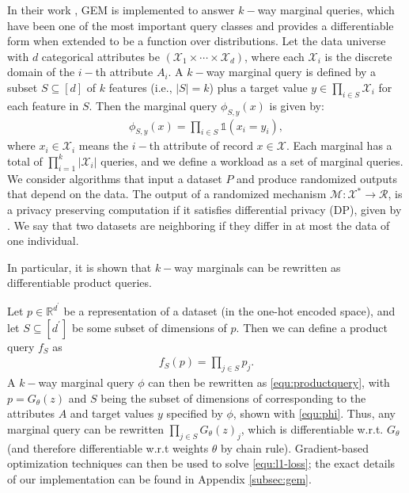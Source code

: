 In their work \citep{liu2021iterative}, GEM is implemented to answer $k-$way marginal queries, which have been one of the most important query classes and provides a differentiable form when extended to be a function over distributions. Let the data universe with $d$ categorical attributes be $(\mathcal{X}_1 \times \cdots \times \mathcal{X}_d)$, where each $\mathcal{X}_i$ is the discrete domain of the $i-$th attribute $A_i$. A $k-$way marginal query is defined by a subset $S\subseteq [d]$ of $k$ features (i.e., $|S| = k$) plus a target value $y\in\prod_{i\in S}\mathcal{X}_i$ for
each feature in $S$. Then the marginal query $\phi_{S,y}(x)$ is given by:
\begin{align}
    \label{equ:phi}
    \phi_{S,y}(x)=\prod _{i\in S}\mathbb{1}(x_i=y_i),
\end{align}
where $x_i\in\mathcal{X}_i$ means the $i-$th attribute of record $x\in \mathcal{X}$. Each marginal has a total of $\prod_{i=1}^{k}|\mathcal{X}_i|$ queries, and we define a workload as a set of marginal queries. We consider algorithms that input a dataset $P$ and produce randomized outputs that depend on the data. The output of a randomized mechanism $\mathcal{M}:\mathcal{X}^{\ast}\rightarrow \mathcal{R}$, is a privacy preserving computation if it satisfies differential privacy (DP), given by \citet{dwork2006calibrating}. We say that two datasets are neighboring if they differ in at most the data of one individual.

In particular, it is shown that $k-$way marginals can be rewritten as differentiable product queries.

Let $p \in \mathbb{R}^{d^\prime}$ be a representation of a dataset (in the one-hot encoded space), and let $S \subseteq [d^\prime]$ be some subset of dimensions of $p$. Then we can define a product query $f_S$ as
\begin{align}
    \label{equ:productquery}
    f_S(p)=\prod_{j\in S}p_j.
\end{align}
A $k-$way marginal query $\phi$ can then be rewritten as \eqref{equ:productquery}, with $p=G_\theta (z)$ and $S$ being the subset of dimensions of
corresponding to the attributes $A$ and target values $y$ specified by $\phi$, shown with \eqref{equ:phi}. Thus, any marginal query can be rewritten $\prod_{j\in S}G_\theta(z)_j$, which is differentiable w.r.t. $G_\theta$ (and therefore differentiable w.r.t weights $\theta$ by chain rule). Gradient-based optimization techniques can then be used to solve \eqref{equ:l1-loss}; the exact details of our implementation can be found in Appendix \ref{subsec:gem}.




